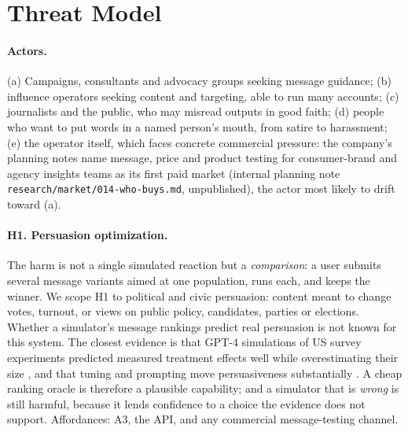 \documentclass[11pt]{article}
\newcommand{\internal}[1]{internal planning note \nolinkurl{#1}, unpublished}
\begin{document}
\begin{itemize}
\end{itemize}

\section{Threat Model}
\label{sec:threats}

\paragraph{Actors.} (a) Campaigns, consultants and advocacy groups seeking message guidance; (b) influence operators seeking content and targeting, able to run many accounts; (c) journalists and the public, who may misread outputs in good faith; (d) people who want to put words in a named person's mouth, from satire to harassment; (e) the operator itself, which faces concrete commercial pressure: the company's planning notes name message, price and product testing for consumer-brand and agency insights teams as its first paid market (\internal{research/market/014-who-buys.md}), the actor most likely to drift toward (a).

\paragraph{H1. Persuasion optimization.} The harm is not a single simulated reaction but a \emph{comparison}: a user submits several message variants aimed at one population, runs each, and keeps the winner. We scope H1 to political and civic persuasion: content meant to change votes, turnout, or views on public policy, candidates, parties or elections. Whether a simulator's message rankings predict real persuasion is not known for this system. The closest evidence is that GPT-4 simulations of US survey experiments predicted measured treatment effects well while overestimating their size \citep{ashokkumar2026predict}, and that tuning and prompting move persuasiveness substantially \citep{hackenburg2025levers}. A cheap ranking oracle is therefore a plausible capability; and a simulator that is \emph{wrong} is still harmful, because it lends confidence to a choice the evidence does not support. Affordances: A3, the API, and any commercial message-testing channel.
\end{document}
